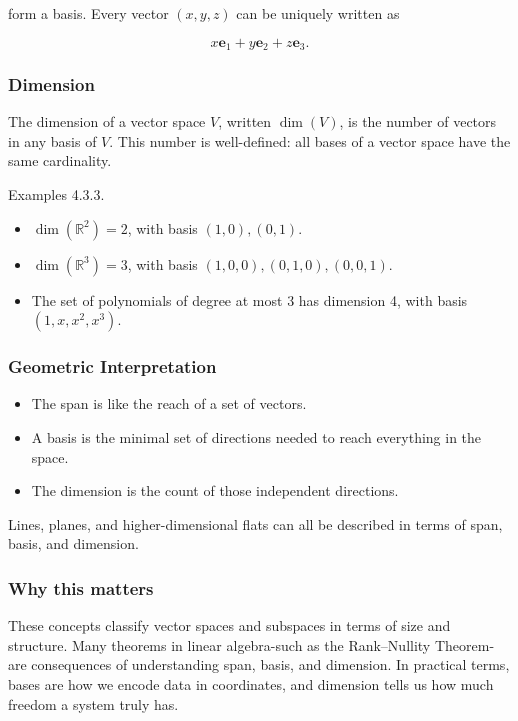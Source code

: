 \documentclass[
  12pt,
  a4paper,
]{article}
\begin{document}
form a basis. Every vector \((x,y,z)\) can be uniquely written as

\[x\mathbf{e}_1 + y\mathbf{e}_2 + z\mathbf{e}_3.\]

\subsubsection{Dimension}\label{dimension}

The dimension of a vector space \(V\), written \(\dim(V)\), is the
number of vectors in any basis of \(V\). This number is well-defined:
all bases of a vector space have the same cardinality.

Examples 4.3.3.

\begin{itemize}
\item
  \(\dim(\mathbb{R}^2) = 2\), with basis \((1,0), (0,1)\).
\item
  \(\dim(\mathbb{R}^3) = 3\), with basis \((1,0,0), (0,1,0), (0,0,1)\).
\item
  The set of polynomials of degree at most 3 has dimension 4, with basis
  \((1, x, x^2, x^3)\).
\end{itemize}

\subsubsection{Geometric
Interpretation}\label{geometric-interpretation-6}

\begin{itemize}
\item
  The span is like the reach of a set of vectors.
\item
  A basis is the minimal set of directions needed to reach everything in
  the space.
\item
  The dimension is the count of those independent directions.
\end{itemize}

Lines, planes, and higher-dimensional flats can all be described in
terms of span, basis, and dimension.

\subsubsection{Why this matters}\label{why-this-matters-14}

These concepts classify vector spaces and subspaces in terms of size and
structure. Many theorems in linear algebra-such as the Rank--Nullity
Theorem-are consequences of understanding span, basis, and dimension. In
practical terms, bases are how we encode data in coordinates, and
dimension tells us how much freedom a system truly has.
\end{document}
